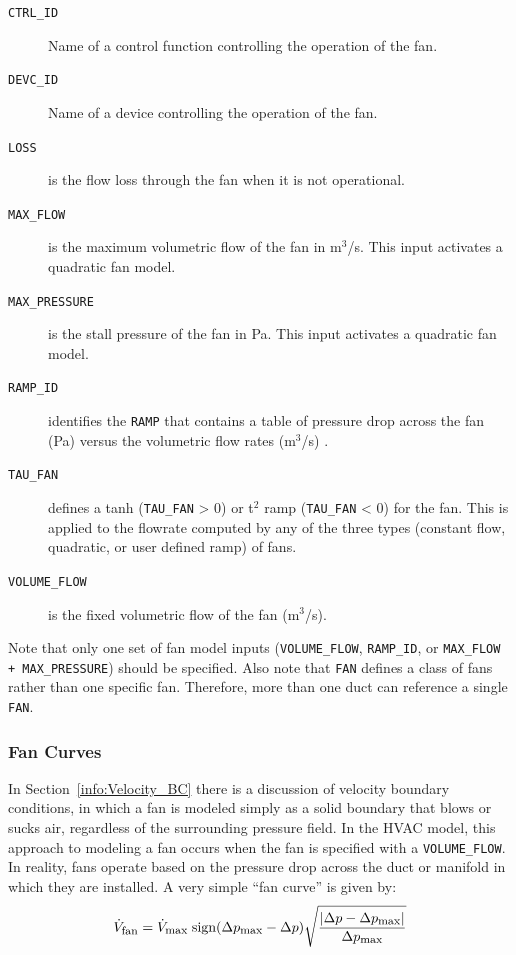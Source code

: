\documentclass[11pt]{book}
\newcommand{\ct}{\tt\small}
\newcommand{\be}{\begin{equation}}
\newcommand{\ee}{\end{equation}}
\begin{document}
\begin{description}
\item[{\ct CTRL\_ID}] Name of a control function controlling the operation of the fan.
\item[{\ct DEVC\_ID}] Name of a device controlling the operation of the fan.
\item[{\ct LOSS}] is the flow loss through the fan when it is not operational.
\item[{\ct MAX\_FLOW}] is the maximum volumetric flow of the fan in m$^3$/s.  This input activates a quadratic fan model.
\item[{\ct MAX\_PRESSURE}] is the stall pressure of the fan in Pa.  This input activates a quadratic fan model.
\item[{\ct RAMP\_ID}] identifies the {\ct RAMP} that contains a table of pressure drop across the fan (Pa) versus the volumetric flow rates (m$^3$/s) .
\item[{\ct TAU\_FAN}]  defines a tanh ({\ct TAU\_FAN} > 0) or t$^2$ ramp ({\ct TAU\_FAN} < 0) for the fan.  This is applied to the flowrate computed by any of the three types (constant flow, quadratic, or user defined ramp) of fans.
\item[{\ct VOLUME\_FLOW}] is the fixed volumetric flow of the fan (m$^3$/s).
\end{description}

\noindent
Note that only one set of fan model inputs ({\ct VOLUME\_FLOW}, {\ct RAMP\_ID}, or {\ct MAX\_FLOW + MAX\_PRESSURE}) should be specified.
Also note that {\ct FAN} defines a class of fans rather than one specific fan. Therefore, more than one duct can reference a single {\ct FAN}.

\subsubsection{Fan Curves}
\label{info:Fan_Curves}

In Section~\ref{info:Velocity_BC} there is a discussion of velocity boundary conditions,
in which a fan is modeled simply as a solid boundary that blows or
sucks air, regardless of the surrounding pressure field. In the HVAC model, this approach to modeling a fan occurs when the fan is specified with a {\ct VOLUME\_FLOW}.
In reality, fans operate based on
the pressure drop across the duct or manifold in which they are
installed. A very simple ``fan curve'' is given by:
\be \dot{V}_{\hbox{\footnotesize fan}} = \dot{V}_{\hbox{\footnotesize max}} \;
   \hbox{sign} (\Delta p_{\hbox{\footnotesize max}}-\Delta p)
   \sqrt{ \frac{ |\Delta p - \Delta p_{\hbox{\footnotesize max}}|}{\Delta p_{\hbox{\footnotesize max}} } }  \ee
\end{document}
